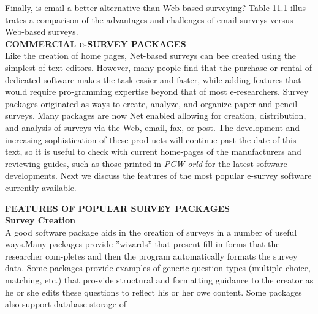 \documentclass[a4,12pt]{book}
\begin{document}
\vspace*{0.5cm}

\hspace*{0.5cm} Finally, is email a better alternative than Web-based surveying? Table 11.1 illus-trates a comparison of the advantages and challenges of email surveys versus Web-based surveys.\\

\vspace*{0.5cm}
\textbf{COMMERCIAL e-SURVEY PACKAGES}\\

\vspace*{0.2cm}
\small{
Like the creation of home pages, Net-based surveys can bee created using the simplest of text editors. However, many people find that the purchase or rental of dedicated software makes the task easier and faster, while adding features that would require pro-gramming expertise beyond that of most e-researchers. Survey packages originated as ways to create, analyze, and organize paper-and-pencil surveys. Many packages are now Net enabled allowing for creation, distribution, and analysis of surveys via the Web, email, fax, or post. The development and increasing sophistication of these prod-ucts will continue past the date of this text, so it is useful to check with current home-pages of the manufacturers and reviewing guides, such as those printed in \emph{PCW orld} for the latest software developments. Next we discuss the features of the most popular e-survey software currently available.}\\

\vspace*{0.5cm}

\textbf{FEATURES OF POPULAR SURVEY PACKAGES}\\

\vspace*{0.5cm}
\textbf{Survey Creation}\\

\vspace*{0.3cm}
A good software package aids in the creation of surveys in a number of useful ways.Many packages provide ''wizards'' that present fill-in forms that the researcher com-pletes and then the program automatically formats the survey data. Some packages provide examples of generic question types (multiple choice, matching, etc.) that pro-vide structural and formatting guidance to the creator as he or she edits these questions to reflect his or her owe content. Some packages also support database storage of \\
\end{document}
